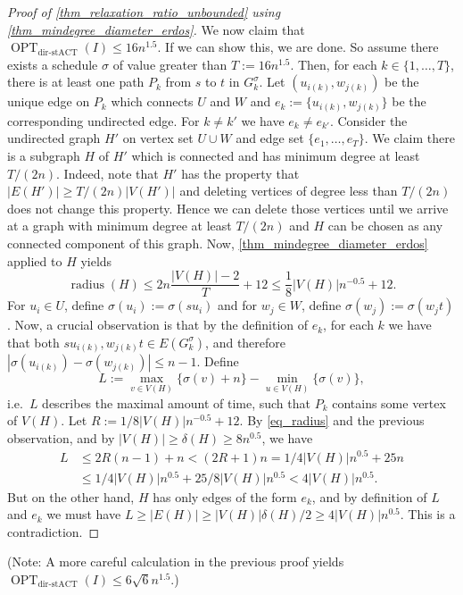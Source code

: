 \documentclass[10pt,a4paper]{article}
\numberwithin{equation}{section}
\newcommand{\set}[1]{\{ #1 \}}
\newcommand{\fromto}[2]{\set{#1, \ldots, #2}}
\DeclareMathOperator{\radius}{\text{radius}}
\DeclareMathOperator{\opt}{OPT}
\newcommand{\optDirStAct}{\opt_\text{dir-stACT}}
\begin{document}
\begin{proof}[Proof of \cref{thm_relaxation_ratio_unbounded} using \cref{thm_mindegree_diameter_erdos}]
We now claim that $\optDirStAct(I) \leq 16n^{1.5}$. If we can show this, we are done. So assume there exists a schedule $\sigma$ of value greater than $T := 16n^{1.5}$. Then, for each $k \in \fromto{1}{T}$, there is at least one path $P_{k}$ from $s$ to $t$ in $G^\sigma_{k}$. Let $(u_{i(k)}, w_{j(k)})$ be the unique edge on $P_k$ which connects $U$ and $W$ and $e_{k} := \{u_{i(k)}, w_{j(k)}\}$ be the corresponding undirected edge. For $k \neq k'$ we have $e_{k} \neq e_{k'}$. Consider the undirected graph $H'$ on vertex set $U \cup W$ and edge set $\fromto{e_1}{e_T}$. 
We claim there is a subgraph $H$ of $H'$ which is connected and has minimum degree at least $T/(2n)$. Indeed, note that $H'$ has the property that $|E(H')| \geq T/(2n)|V(H')|$ and deleting vertices of degree less than $T/(2n)$ does not change this property. Hence we can delete those vertices until we arrive at a graph with minimum degree at least $T/(2n)$ and $H$ can be chosen as any connected component of this graph. Now, \cref{thm_mindegree_diameter_erdos} applied to $H$ yields
\begin{equation}
\radius(H) \leq 2n\frac{|V(H)| - 2}{T} + 12  \leq \frac 1{8}|V(H)|n^{-0.5}+12. \label{eq_radius}
\end{equation}
For $u_i \in U$, define $\sigma(u_i) := \sigma(su_i)$ and for $w_j \in W$, define $\sigma(w_j) := \sigma(w_jt)$. Now, a crucial observation is that by the definition of $e_k$, for each $k$ we have that both $su_{i(k)}, w_{j(k)}t \in E(G_k^\sigma)$, and therefore $|\sigma(u_{i(k)}) - \sigma(w_{j(k)})| \leq n - 1$. Define \[ L := \max_{v \in V(H)}\set{ \sigma(v) + n } - \min_{u \in V(H)} \set{\sigma(v)}, \] i.e.\ $L$ describes the maximal amount of time, such that $P_k$ contains some vertex of $V(H)$. Let $R := 1/8|V(H)|n^{-0.5} +12$. By \cref{eq_radius} and the previous observation, and by $|V(H)| \geq \delta(H) \geq 8n^{0.5}$, we have 
\begin{align*}
L &\leq 2R(n-1) + n < (2R + 1)n = 1/4|V(H)|n^{0.5} + 25n\\ 
&\leq 1/4|V(H)|n^{0.5} + 25/8|V(H)|n^{0.5} < 4|V(H)|n^{0.5}.
\end{align*}
But on the other hand, $H$ has only edges of the form $e_k$, and by definition of $L$ and $e_k$ we must have $L \geq |E(H)| \geq |V(H)|\delta(H)/2 \geq 4|V(H)|n^{0.5}$. This is a contradiction.
\end{proof} 
(Note: A more careful calculation in the previous proof yields $\optDirStAct(I) \leq 6\sqrt{6}n^{1.5}$.)
\end{document}
